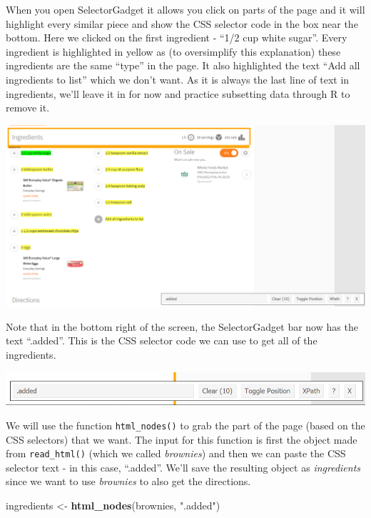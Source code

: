 \documentclass[
  12pt,
]{book}
\newenvironment{Shaded}{\begin{snugshade}}{\end{snugshade}}
\newcommand{\KeywordTok}[1]{\textcolor[rgb]{0.13,0.29,0.53}{\textbf{#1}}}
\newcommand{\NormalTok}[1]{#1}
\newcommand{\StringTok}[1]{\textcolor[rgb]{0.31,0.60,0.02}{#1}}
\begin{document}
When you open SelectorGadget it allows you click on parts of the page and it will highlight every similar piece and show the CSS selector code in the box near the bottom. Here we clicked on the first ingredient - ``1/2 cup white sugar''. Every ingredient is highlighted in yellow as (to oversimplify this explanation) these ingredients are the same ``type'' in the page. It also highlighted the text ``Add all ingredients to list'' which we don't want. As it is always the last line of text in ingredients, we'll leave it in for now and practice subsetting data through R to remove it.

\includegraphics{images/brownies_3.PNG}

Note that in the bottom right of the screen, the SelectorGadget bar now has the text ``.added''. This is the CSS selector code we can use to get all of the ingredients.

\includegraphics{images/brownies_4.PNG}

We will use the function \texttt{html\_nodes()} to grab the part of the page (based on the CSS selectors) that we want. The input for this function is first the object made from \texttt{read\_html()} (which we called \emph{brownies}) and then we can paste the CSS selector text - in this case, ``.added''. We'll save the resulting object as \emph{ingredients} since we want to use \emph{brownies} to also get the directions.

\begin{Shaded}
\begin{Highlighting}[]
\NormalTok{ingredients <{-}}\StringTok{ }\KeywordTok{html\_nodes}\NormalTok{(brownies, }\StringTok{".added"}\NormalTok{)}
\end{Highlighting}
\end{Shaded}
\end{document}
